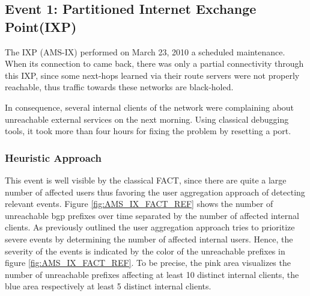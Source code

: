 \subsection{Event 1: Partitioned Internet Exchange Point(IXP)}

The IXP \citet{AMS-IX}(AMS-IX) performed on March 23, 2010 a scheduled 
maintenance. When its connection to \citet{switch} came back, there was only a 
partial connectivity through this IXP, since some next-hops learned via their 
route servers were not properly reachable, thus traffic towards these networks 
are black-holed.\citep{SchatzmannPAM2011}

In consequence, several internal clients of the \citet{switch} network were 
complaining about unreachable external services on the next morning. Using 
classical debugging tools, it took more than four hours for fixing the problem 
by resetting a port.\citep{SchatzmannPAM2011}

\subsubsection{Heuristic Approach} This event is well visible by the classical 
\gls{FACT}, since there are quite a large number of affected users thus favoring 
the user aggregation approach of detecting relevant events. 
Figure \ref{fig:AMS_IX_FACT_REF} shows the number of unreachable \gls{bgp} 
prefixes over time separated by the number of affected internal clients. As 
previously outlined the user aggregation approach tries to prioritize severe 
events by determining the number of affected internal users. 
Hence, the severity of the events is indicated by the color of the unreachable 
prefixes in figure \ref{fig:AMS_IX_FACT_REF}. To be precise, the pink area 
visualizes the number of unreachable prefixes affecting at least 10 distinct 
internal clients, the blue area respectively at least 5 distinct 
internal clients.

